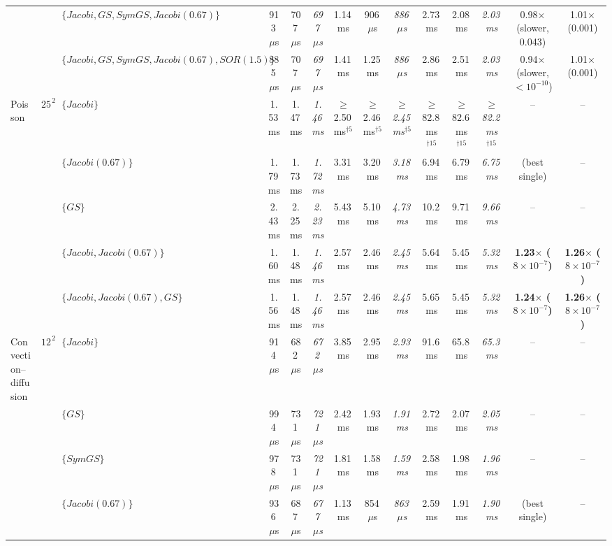 {\begin{tabular}{lllccccccccccc}
 &  & $\{Jacobi, GS, SymGS, Jacobi (0.67)\}$ & 913\,$\mu$s & 707\,$\mu$s & \textit{697\,$\mu$s} & 1.14\,ms & 906\,$\mu$s & \textit{886\,$\mu$s} & 2.73\,ms & 2.08\,ms & \textit{2.03\,ms} & 0.98$\times$ (slower, 0.043) & 1.01$\times$ (0.001) \\
 &  & $\{Jacobi, GS, SymGS, Jacobi (0.67), SOR (1.5)\}$ & 885\,$\mu$s & 707\,$\mu$s & \textit{697\,$\mu$s} & 1.41\,ms & 1.25\,ms & \textit{886\,$\mu$s} & 2.86\,ms & 2.51\,ms & \textit{2.03\,ms} & 0.94$\times$ (slower, $<10^{-10}$) & 1.01$\times$ (0.001) \\
\midrule
Poisson & $256^2$ & $\{Jacobi\}$ & 1.53\,ms & 1.47\,ms & \textit{1.46\,ms} & $\geq$2.50\,ms$^{\dagger 5}$ & $\geq$2.46\,ms$^{\dagger 5}$ & \textit{$\geq$2.45\,ms$^{\dagger 5}$} & $\geq$82.8\,ms$^{\dagger 15}$ & $\geq$82.6\,ms$^{\dagger 15}$ & \textit{$\geq$82.2\,ms$^{\dagger 15}$} & -- & -- \\
 &  & $\{Jacobi (0.67)\}$ & 1.79\,ms & 1.73\,ms & \textit{1.72\,ms} & 3.31\,ms & 3.20\,ms & \textit{3.18\,ms} & 6.94\,ms & 6.79\,ms & \textit{6.75\,ms} & (best single) & -- \\
 &  & $\{GS\}$ & 2.43\,ms & 2.25\,ms & \textit{2.23\,ms} & 5.43\,ms & 5.10\,ms & \textit{4.73\,ms} & 10.2\,ms & 9.71\,ms & \textit{9.66\,ms} & -- & -- \\
 &  & $\{Jacobi, Jacobi (0.67)\}$ & 1.60\,ms & 1.48\,ms & \textit{1.46\,ms} & 2.57\,ms & 2.46\,ms & \textit{2.45\,ms} & 5.64\,ms & 5.45\,ms & \textit{5.32\,ms} & \textbf{1.23$\times$ ($8\times10^{-7}$)} & \textbf{1.26$\times$ ($8\times10^{-7}$)} \\
 &  & $\{Jacobi, Jacobi (0.67), GS\}$ & 1.56\,ms & 1.48\,ms & \textit{1.46\,ms} & 2.57\,ms & 2.46\,ms & \textit{2.45\,ms} & 5.65\,ms & 5.45\,ms & \textit{5.32\,ms} & \textbf{1.24$\times$ ($8\times10^{-7}$)} & \textbf{1.26$\times$ ($8\times10^{-7}$)} \\
\midrule
Convection--diffusion & $128^2$ & $\{Jacobi\}$ & 914\,$\mu$s & 682\,$\mu$s & \textit{672\,$\mu$s} & 3.85\,ms & 2.95\,ms & \textit{2.93\,ms} & 91.6\,ms & 65.8\,ms & \textit{65.3\,ms} & -- & -- \\
 &  & $\{GS\}$ & 994\,$\mu$s & 731\,$\mu$s & \textit{721\,$\mu$s} & 2.42\,ms & 1.93\,ms & \textit{1.91\,ms} & 2.72\,ms & 2.07\,ms & \textit{2.05\,ms} & -- & -- \\
 &  & $\{SymGS\}$ & 978\,$\mu$s & 731\,$\mu$s & \textit{721\,$\mu$s} & 1.81\,ms & 1.58\,ms & \textit{1.59\,ms} & 2.58\,ms & 1.98\,ms & \textit{1.96\,ms} & -- & -- \\
 &  & $\{Jacobi (0.67)\}$ & 936\,$\mu$s & 687\,$\mu$s & \textit{677\,$\mu$s} & 1.13\,ms & 854\,$\mu$s & \textit{863\,$\mu$s} & 2.59\,ms & 1.91\,ms & \textit{1.90\,ms} & (best single) & -- \\

\end{tabular}}

